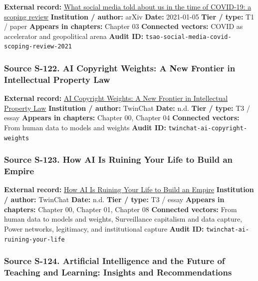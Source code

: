 \documentclass[
  american,
  11pt,
  letterpaper,
]{article}
\begin{document}
\textbf{External record:} \href{https://arxiv.org/abs/2101.01688}{What
social media told about us in the time of COVID-19: a scoping review}
\textbf{Institution / author:} arXiv \textbf{Date:} 2021-01-05
\textbf{Tier / type:} T1 / paper \textbf{Appears in chapters:} Chapter
03 \textbf{Connected vectors:} COVID as accelerator and geopolitical
arena \textbf{Audit ID:}
\texttt{tsao-social-media-covid-scoping-review-2021}

\subsubsection{Source S-122. AI Copyright Weights: A New Frontier in
Intellectual Property
Law}\label{source-s-122-ai-copyright-weights-a-new-frontier-in-intellectual-property-law}

\textbf{External record:}
\href{https://medium.com/twinchat/ai-copyright-weights-a-new-frontier-in-intellectual-property-law-d8ee1b6c55ee}{AI
Copyright Weights: A New Frontier in Intellectual Property Law}
\textbf{Institution / author:} TwinChat \textbf{Date:} n.d. \textbf{Tier
/ type:} T3 / essay \textbf{Appears in chapters:} Chapter 00, Chapter 04
\textbf{Connected vectors:} From human data to models and weights
\textbf{Audit ID:} \texttt{twinchat-ai-copyright-weights}

\subsubsection{Source S-123. How AI Is Ruining Your Life to Build an
Empire}\label{source-s-123-how-ai-is-ruining-your-life-to-build-an-empire}

\textbf{External record:}
\href{https://medium.com/twinchat/how-ai-is-ruining-your-life-to-build-an-empire-8b6d02e55bc9}{How
AI Is Ruining Your Life to Build an Empire} \textbf{Institution /
author:} TwinChat \textbf{Date:} n.d. \textbf{Tier / type:} T3 / essay
\textbf{Appears in chapters:} Chapter 00, Chapter 01, Chapter 08
\textbf{Connected vectors:} From human data to models and weights,
Surveillance capitalism and data capture, Power networks, legitimacy,
and institutional capture \textbf{Audit ID:}
\texttt{twinchat-ai-ruining-your-life}

\subsubsection{Source S-124. Artificial Intelligence and the Future of
Teaching and Learning: Insights and
Recommendations}\label{source-s-124-artificial-intelligence-and-the-future-of-teaching-and-learning-insights-and-recommendations}
\end{document}
